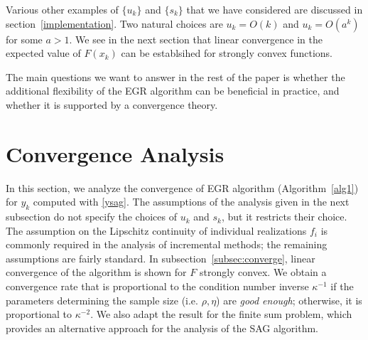 \documentclass[11pt]{article}
\begin{document}
Various other examples of $\{ u_k \}$ and $\{ s_k \}$ that we have considered are discussed in section~\ref{implementation}. Two natural choices are $u_k = O(k)$ and $u_k = O(a^k)$ for some $a>1$. We see in the next section that linear convergence in the expected value of $F(x_k)$ can be establsihed for strongly convex functions. 

The main questions we want to answer in the rest of the paper is whether the additional flexibility of the EGR algorithm can be beneficial in practice, and whether it is supported by a convergence theory.




\newpage   
\section{Convergence Analysis}  \label{analysis}

% 

In this section, we analyze the convergence of EGR algorithm (Algorithm~\ref{alg1}) for $y_k$ computed with \eqref{ysag}.  The assumptions of the analysis given in the next subsection do not specify the choices of $u_k$ and $s_k$, but it restricts their choice.  The assumption on the Lipschitz continuity of individual realizations $f_i$ is commonly required in the analysis of incremental methods; the remaining assumptions are fairly standard.  In subsection~\ref{subsec:converge}, linear convergence of the algorithm is shown for $F$ strongly convex.  We obtain a convergence rate that is proportional to the condition number inverse $\kappa^{-1}$ if the parameters determining the sample size (i.e. $\rho,\eta$) are \emph{good enough}; otherwise, it is proportional to $\kappa^{-2}$.  We also adapt the result for the finite sum problem, which provides an alternative approach for the analysis of the SAG algorithm.
\end{document}
